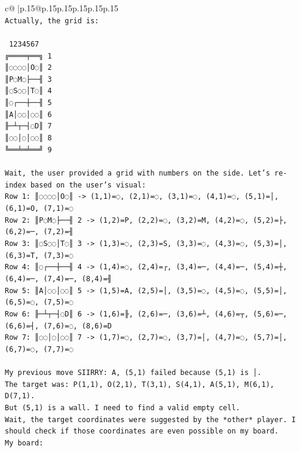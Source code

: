 \documentclass{article}
\begin{document}
{\begin{supertabular}{c@{$\;$}|p{.15\linewidth}@{}p{.15\linewidth}p{.15\linewidth}p{.15\linewidth}p{.15\linewidth}p{.15\linewidth}}
{{{\\ 
\texttt{Actually, the grid is:} \\
\\ 
\texttt{ 1234567} \\
\texttt{╔════╤══╗ 1} \\
\texttt{║◌◌◌◌│O◌║ 2} \\
\texttt{║P◌M◌├──╢ 3} \\
\texttt{║◌S◌◌│T◌║ 4} \\
\texttt{║◌┌──┼──╢ 5} \\
\texttt{║A│◌◌│◌◌║ 6} \\
\texttt{╟─┴┬─┤◌D║ 7} \\
\texttt{║◌◌│◌│◌◌║ 8} \\
\texttt{╚══╧═╧══╝ 9} \\
\\ 
\texttt{Wait, the user provided a grid with numbers on the side. Let's re{-}index based on the user's visual:} \\
\texttt{Row 1: ║◌◌◌◌│O◌║ {-}> (1,1)=◌, (2,1)=◌, (3,1)=◌, (4,1)=◌, (5,1)=│, (6,1)=O, (7,1)=◌} \\
\texttt{Row 2: ║P◌M◌├──╢ 2 {-}> (1,2)=P, (2,2)=◌, (3,2)=M, (4,2)=◌, (5,2)=├, (6,2)=─, (7,2)=╢} \\
\texttt{Row 3: ║◌S◌◌│T◌║ 3 {-}> (1,3)=◌, (2,3)=S, (3,3)=◌, (4,3)=◌, (5,3)=│, (6,3)=T, (7,3)=◌} \\
\texttt{Row 4: ║◌┌──┼──╢ 4 {-}> (1,4)=◌, (2,4)=┌, (3,4)=─, (4,4)=─, (5,4)=┼, (6,4)=─, (7,4)=─, (8,4)=╢} \\
\texttt{Row 5: ║A│◌◌│◌◌║ 5 {-}> (1,5)=A, (2,5)=│, (3,5)=◌, (4,5)=◌, (5,5)=│, (6,5)=◌, (7,5)=◌} \\
\texttt{Row 6: ╟─┴┬─┤◌D║ 6 {-}> (1,6)=╟, (2,6)=─, (3,6)=┴, (4,6)=┬, (5,6)=─, (6,6)=┤, (7,6)=◌, (8,6)=D} \\
\texttt{Row 7: ║◌◌│◌│◌◌║ 7 {-}> (1,7)=◌, (2,7)=◌, (3,7)=│, (4,7)=◌, (5,7)=│, (6,7)=◌, (7,7)=◌} \\
\\ 
\texttt{My previous move SIIRRY: A, (5,1) failed because (5,1) is │.} \\
\texttt{The target was: P(1,1), O(2,1), T(3,1), S(4,1), A(5,1), M(6,1), D(7,1).} \\
\texttt{But (5,1) is a wall. I need to find a valid empty cell.} \\
\texttt{Wait, the target coordinates were suggested by the *other* player. I should check if those coordinates are even possible on my board.} \\
\texttt{My board:} \\
}}}
\end{supertabular}}
\end{document}
